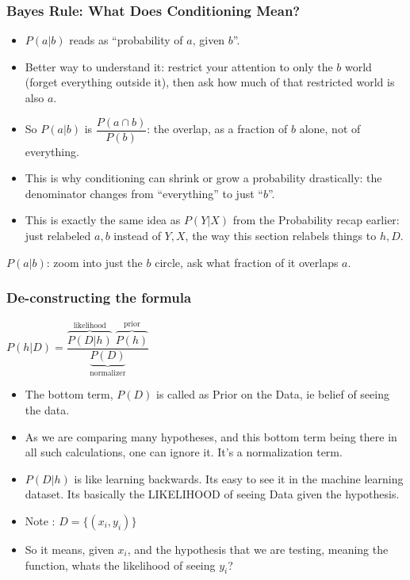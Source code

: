\begin{frame}[fragile]\frametitle{Bayes Rule: What Does Conditioning Mean?}
\begin{itemize}
\item $P(a|b)$ reads as ``probability of $a$, given $b$''.
\item Better way to understand it: restrict your attention to only the $b$ world (forget everything outside it), then ask how much of that restricted world is also $a$.
\item So $P(a|b)$ is $\dfrac{P(a \cap b)}{P(b)}$: the overlap, as a fraction of $b$ alone, not of everything.
\item This is why conditioning can shrink or grow a probability drastically: the denominator changes from ``everything'' to just ``$b$''.
\item This is exactly the same idea as $P(Y|X)$ from the Probability recap earlier: just relabeled $a,b$ instead of $Y,X$, the way this section relabels things to $h,D$.
\end{itemize}
\begin{center}

{\small $P(a|b)$: zoom into just the $b$ circle, ask what fraction of it overlaps $a$.}
\end{center}
\end{frame}

\begin{frame}[fragile]\frametitle{De-constructing the formula}

\begin{center}
$P(h|D) = \dfrac{\overbrace{P(D|h)}^{\text{likelihood}}\;\overbrace{P(h)}^{\text{prior}}}{\underbrace{P(D)}_{\text{normalizer}}}$
\end{center}

\begin{itemize}
\item The bottom term, $P(D)$ is called as Prior on the Data, ie belief of seeing the data.
\item As we are comparing many hypotheses, and this bottom term being there in all such calculations, one can ignore it. It’s a normalization term.
\item $P(D|h)$ is like learning backwards. Its easy to see it in the machine learning dataset. Its basically the LIKELIHOOD of seeing Data given the hypothesis.
\item Note : $D = \{(x_i, y_i)\}$
\item So it means, given $x_i$, and the hypothesis that we are testing, meaning the function, whats the likelihood of seeing $y_i$?

\end{itemize}

\end{frame}

